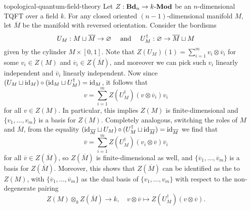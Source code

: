 
\begin{example}{topological-quantum-field-theory}
    Let $Z : \textbf{Bd}_n \to k\textup{-}\textbf{Mod}$ be an $n$-dimensional TQFT over a field $k$. For any closed oriented $(n - 1)$-dimensional manifold $M$, let $\overline{M}$ be the manifold with reversed orientation. Consider the bordisms
    \[ U_M : M \sqcup \overline{M} \to \varnothing \quad \textup{ and } \quad U_M^\dag : \varnothing \to \overline{M} \sqcup M \]
    given by the cylinder $M \times [0, 1]$.
    Note that $Z(U_M)(1) = \sum_{i = 1}^{m} v_i \otimes \overline{v}_i$ for some $v_i \in Z(M)$ and $\overline{v}_i \in Z(\overline{M})$, and moreover we can pick such $v_i$ linearly independent and $\overline{v}_i$ linearly independent.
    Now since $(U_M \sqcup \text{id}_M) \circ (\text{id}_M \sqcup U_M^\dag) = \text{id}_M$, it follows that
    \[ v = \sum_{i = 1}^{m} Z(U_M^\dag)(v \otimes \overline{v}_i) v_i \]
    for all $v \in Z(M)$. In particular, this implies $Z(M)$ is finite-dimensional and $\{ v_1, \ldots, v_m \}$ is a basis for $Z(M)$.
    Completely analogous, switching the roles of $M$ and $\overline{M}$, from the equality $(\text{id}_{\overline{M}} \sqcup U_M) \circ (U_M^\dag \sqcup \text{id}_{\overline{M}}) = \text{id}_{\overline{M}}$ we find that
    \[ \overline{v} = \sum_{i = 1}^{m} Z(U_M^\dag)(v_i \otimes \overline{v}) \overline{v}_i \]
    for all $\overline{v} \in Z(\overline{M})$, so $Z(\overline{M})$ is finite-dimensional as well, and $\{ \overline{v}_1, \ldots, \overline{v}_m \}$ is a basis for $Z(\overline{M})$. Moreover, this shows that $Z(\overline{M})$ can be identified as the  to $Z(M)$, with $\{ \overline{v}_1, \ldots, \overline{v}_m \}$ as the dual basis of $\{ v_1, \ldots, v_m \}$ with respect to the non-degenerate pairing
    \[ Z(M) \otimes_k Z(\overline{M}) \to k, \quad v \otimes \overline{v} \mapsto Z(U_M^\dagger)(v \otimes \overline{v}) . \]
\end{example}
